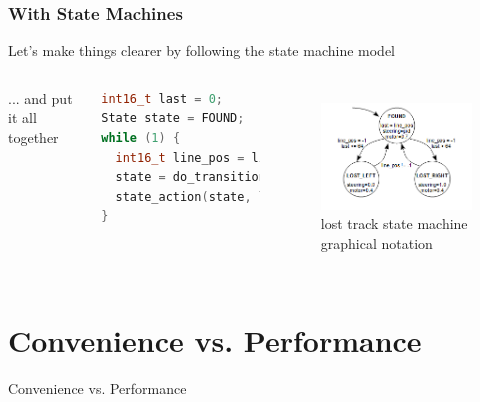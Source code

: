 \documentclass{beamer}
\begin{document}
\begin{frame}[fragile]
\frametitle{With State Machines}
Let's make things clearer by following the state machine model
\vspace{5px}
\begin{columns}[t]
... and put it all together
\begin{lstlisting}[language=C++,basicstyle=\ttfamily\tiny]
int16_t last = 0;
State state = FOUND;
while (1) {
  int16_t line_pos = line_detect(camera_data);
  state = do_transition(state, line_pos, last);
  state_action(state, line_pos, last);
}
\end{lstlisting}

\begin{figure}[h!]
\includegraphics[width=1.0\columnwidth]{images-dis10/statemachine} \\
lost track state machine \\
graphical notation
\end{figure}
\end{columns}
\end{frame}

\section{Convenience vs. Performance} %
\begin{frame}
\centering \huge Convenience vs. Performance
\end{frame}
\end{document}
